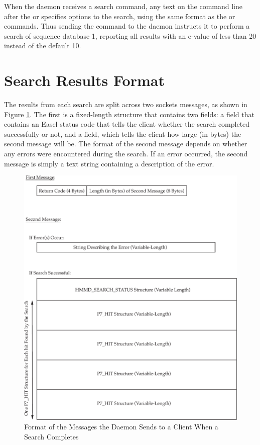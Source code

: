 \documentclass[notoc,justified]{tufte-book}    %
\begin{document}
When the daemon receives a search command, any text on the command line after the  or  specifies options to the search, using the same format as the  or  commands.  Thus sending the command  to the daemon instructs it to perform a search of sequence database 1, reporting all results with an e-value of less than 20 instead of the default 10.


\section{Search Results Format}
The results from each search are split across two sockets messages, as shown in Figure \ref{fig:search-results}.  The first is a fixed-length  structure that contains two fields: a  field that contains an Easel status code that tells the client whether the search completed successfully or not, and a  field, which tells the client how large (in bytes) the second message will be.  The format of the second message depends on whether any errors were encountered during the search.  If an error occurred, the second message is simply a text string containing a description of the error.  


\begin{figure}
\includegraphics[width=\textwidth]{inclusions/daemon-results.pdf}
\caption{Format of the Messages the Daemon Sends to a Client When a Search Completes}
\label{fig:search-results}
\end{figure}
\end{document}
